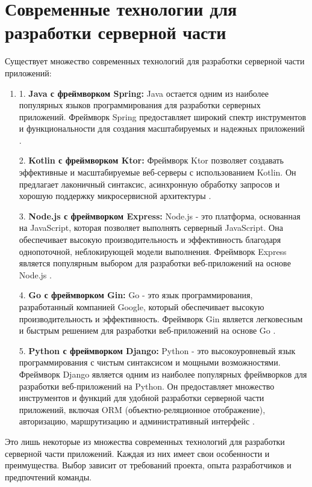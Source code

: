 \section{Современные технологии для разработки серверной части}
Существует множество современных технологий для разработки серверной части приложений:

\begin{enumerate}
    \item 1. \textbf{Java с фреймворком Spring:} Java остается одним из наиболее популярных 
    языков программирования для разработки серверных приложений. 
    Фреймворк Spring предоставляет широкий спектр инструментов и функциональности для 
    создания масштабируемых и надежных приложений \cite[27]{SpringInAction}.

    2. \textbf{Kotlin с фреймворком Ktor:} Фреймворк Ktor позволяет создавать 
    эффективные и масштабируемые веб-серверы 
    с использованием Kotlin. 
    Он предлагает лаконичный синтаксис, асинхронную обработку запросов и хорошую 
    поддержку микросервисной архитектуры \cite{Ktor}.
    
    3. \textbf{Node.js с фреймворком Express:} Node.js - это платформа, основанная на JavaScript, 
    которая позволяет выполнять серверный JavaScript. 
    Она обеспечивает высокую производительность и эффективность благодаря однопоточной, неблокирующей модели выполнения. 
    Фреймворк Express является популярным выбором для разработки веб-приложений на основе Node.js \cite[26]{WebJS}.
    
    4. \textbf{Go с фреймворком Gin:} Go - это язык программирования, разработанный компанией Google, 
    который обеспечивает высокую производительность и эффективность. 
    Фреймворк Gin является легковесным и быстрым решением для разработки веб-приложений на основе Go \cite{GoGin}.
    
    5. \textbf{Python с фреймворком Django:} Python - это высокоуровневый язык программирования с 
    чистым синтаксисом и мощными возможностями. 
    Фреймворк Django является одним из наиболее популярных фреймворков для разработки веб-приложений на Python. 
    Он предоставляет множество инструментов и функций для удобной разработки серверной части приложений, 
    включая ORM (объектно-реляционное отображение), авторизацию, маршрутизацию и административный интерфейс \cite[18]{Django30}.
\end{enumerate}

Это лишь некоторые из множества современных технологий для разработки серверной части приложений.
Каждая из них имеет свои особенности и преимущества. 
Выбор зависит от требований проекта, опыта разработчиков и предпочтений команды.

